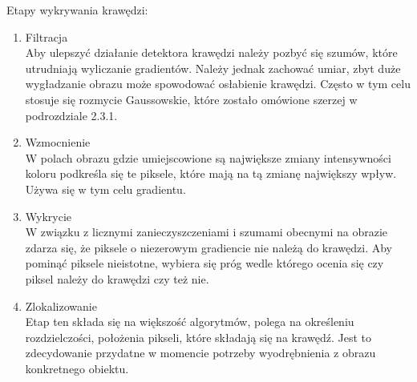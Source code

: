 \documentclass[eng,oneside]{mgr}
\begin{document}
\hspace{1cm} Etapy wykrywania krawędzi:
\begin{enumerate}
\item Filtracja\\
Aby ulepszyć działanie detektora krawędzi należy pozbyć się szumów, które utrudniają wyliczanie gradientów. Należy jednak zachować umiar, zbyt duże wygładzanie obrazu może spowodować osłabienie krawędzi. Często w tym celu stosuje się rozmycie Gaussowskie, które zostało omówione szerzej w podrozdziale 2.3.1.
\item Wzmocnienie \\
W polach obrazu gdzie umiejscowione są największe zmiany intensywności koloru podkreśla się te piksele, które mają na tą zmianę największy wpływ. Używa się w tym celu gradientu.
\item Wykrycie\\
W związku z licznymi zanieczyszczeniami i szumami obecnymi na obrazie zdarza się, że piksele o niezerowym gradiencie nie należą do krawędzi. Aby pominąć piksele nieistotne, wybiera się próg wedle którego ocenia się czy piksel należy do krawędzi czy też nie.
\item Zlokalizowanie\\
Etap ten składa się na większość algorytmów, polega na określeniu rozdzielczości, położenia pikseli, które składają się na krawędź. Jest to zdecydowanie przydatne w momencie potrzeby wyodrębnienia z obrazu konkretnego obiektu\cite{etapy}.

\end{enumerate}
\end{document}
